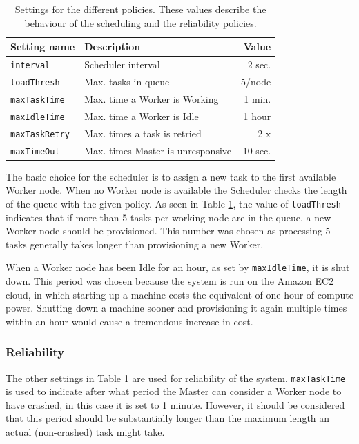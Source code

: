 \documentclass{acm_proc_article-sp}
\begin{document}
\begin{table}
	\centering
	\begin{tabular}{| l | l | r |}
		\hline
		Setting name & Description & Value \\ \hline \hline
		\texttt{interval} & Scheduler interval & 2 sec. \\ \hline
		\texttt{loadThresh} & Max. tasks in queue & 5/node \\ \hline
		\texttt{maxTaskTime} & Max. time a Worker is Working & 1 min. \\ \hline
		\texttt{maxIdleTime} & Max. time a Worker is Idle & 1 hour \\ \hline
		\texttt{maxTaskRetry} & Max. times a task is retried & 2 x\\ \hline
		\texttt{maxTimeOut} & Max. times Master is unresponsive & 10 sec. \\ \hline
	\end{tabular}
	\caption{Settings for the different policies. These values describe the behaviour of the scheduling and the reliability policies.}
	\label{tbl:policy}
\end{table}

The basic choice for the scheduler is to assign a new task to the first available Worker node.
When no Worker node is available the Scheduler checks the length of the queue with the given policy.
As seen in Table \ref{tbl:policy}, the value of \texttt{loadThresh} indicates that if more than 5 tasks per working node are in the queue, a new Worker node should be provisioned.
This number was chosen as processing 5 tasks generally takes longer than provisioning a new Worker.

When a Worker node has been Idle for an hour, as set by \texttt{maxIdleTime}, it is shut down.
This period was chosen because the system is run on the Amazon EC2 cloud, in which starting up a machine costs the equivalent of one hour of compute power.
Shutting down a machine sooner and provisioning it again multiple times within an hour would cause a tremendous increase in cost.

\subsubsection{Reliability}
The other settings in Table \ref{tbl:policy} are used for reliability of the system.
\texttt{maxTaskTime} is used to indicate after what period the Master can consider a Worker node to have crashed, in this case it is set to 1 minute.
However, it should be considered that this period should be substantially longer than the maximum length an actual (non-crashed) task might take.
\end{document}
